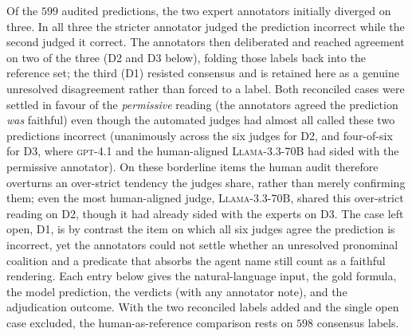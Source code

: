 \documentclass[letterpaper]{article}
\begin{document}
Of the $599$ audited predictions, the two expert annotators initially diverged on three. In all three the stricter annotator judged the prediction incorrect while the second judged it correct. The annotators then deliberated and reached agreement on two of the three (D2 and D3 below), folding those labels back into the reference set; the third (D1) resisted consensus and is retained here as a genuine unresolved disagreement rather than forced to a label. Both reconciled cases were settled in favour of the \emph{permissive} reading (the annotators agreed the prediction \emph{was} faithful) even though the automated judges had almost all called these two predictions incorrect (unanimously across the six judges for D2, and four-of-six for D3, where \textsc{gpt-4.1} and the human-aligned \textsc{Llama-3.3-70B} had sided with the permissive annotator). On these borderline items the human audit therefore overturns an over-strict tendency the judges share, rather than merely confirming them; even the most human-aligned judge, \textsc{Llama-3.3-70B}, shared this over-strict reading on D2, though it had already sided with the experts on D3. The case left open, D1, is by contrast the item on which all six judges agree the prediction is incorrect, yet the annotators could not settle whether an unresolved pronominal coalition and a predicate that absorbs the agent name still count as a faithful rendering. Each entry below gives the natural-language input, the gold formula, the model prediction, the verdicts (with any annotator note), and the adjudication outcome. With the two reconciled labels added and the single open case excluded, the human-as-reference comparison rests on $598$ consensus labels.
\end{document}
